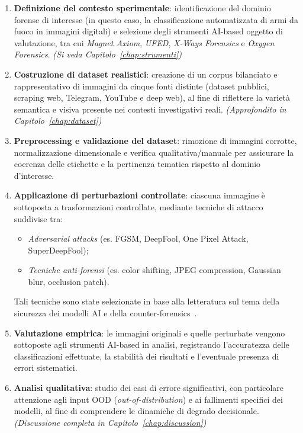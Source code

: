 \begin{enumerate}
    \item \textbf{Definizione del contesto sperimentale}: identificazione del dominio forense di interesse (in questo caso, la classificazione automatizzata di armi da fuoco in immagini digitali) e selezione degli strumenti AI-based oggetto di valutazione, tra cui \textit{Magnet Axiom}, \textit{UFED}, \textit{X-Ways Forensics} e \textit{Oxygen Forensics}. \textit{(Si veda Capitolo~\ref{chap:strumenti})}
    
    \item \textbf{Costruzione di dataset realistici}: creazione di un corpus bilanciato e rappresentativo di immagini da cinque fonti distinte (dataset pubblici, scraping web, Telegram, YouTube e deep web), al fine di riflettere la varietà semantica e visiva presente nei contesti investigativi reali. \textit{(Approfondito in Capitolo~\ref{chap:dataset})}
    
    \item \textbf{Preprocessing e validazione del dataset}: rimozione di immagini corrotte, normalizzazione dimensionale e verifica qualitativa/manuale per assicurare la coerenza delle etichette e la pertinenza tematica rispetto al dominio d’interesse.
    
    \item \textbf{Applicazione di perturbazioni controllate}: ciascuna immagine è sottoposta a trasformazioni controllate, mediante tecniche di attacco suddivise tra:
    \begin{itemize}
        \item \textit{Adversarial attacks} (es. FGSM, DeepFool, One Pixel Attack, SuperDeepFool);
        \item \textit{Tecniche anti-forensi} (es. color shifting, JPEG compression, Gaussian blur, occlusion patch).
    \end{itemize}
    Tali tecniche sono state selezionate in base alla letteratura sul tema della sicurezza dei modelli AI e della counter-forensics~\cite{barni2020forensics, nowroozi2020presentation}.
    
    \item \textbf{Valutazione empirica}: le immagini originali e quelle perturbate vengono sottoposte agli strumenti AI-based in analisi, registrando l’accuratezza delle classificazioni effettuate, la stabilità dei risultati e l'eventuale presenza di errori sistematici.
    
    \item \textbf{Analisi qualitativa}: studio dei casi di errore significativi, con particolare attenzione agli input OOD (\textit{out-of-distribution}) e ai fallimenti specifici dei modelli, al fine di comprendere le dinamiche di degrado decisionale. \textit{(Discussione completa in Capitolo~\ref{chap:discussion})}
\end{enumerate}

